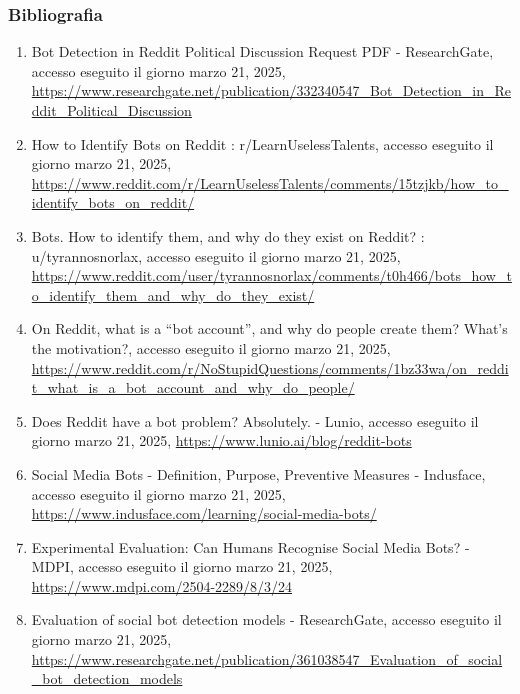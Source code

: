 \documentclass[
  12pt,
  letterpaper,
  DIV=11,
  numbers=noendperiod]{scrartcl}
\providecommand{\tightlist}{%
  \setlength{\itemsep}{0pt}\setlength{\parskip}{0pt}}\usepackage{longtable,booktabs,array}
\begin{document}
\subsubsection{\texorpdfstring{\textbf{Bibliografia}}{Bibliografia}}\label{bibliografia}

\begin{enumerate}
\def\labelenumi{\arabic{enumi}.}
\tightlist
\item
  Bot Detection in Reddit Political Discussion \textbar{} Request PDF -
  ResearchGate, accesso eseguito il giorno marzo 21, 2025,
  \url{https://www.researchgate.net/publication/332340547_Bot_Detection_in_Reddit_Political_Discussion}\\
\item
  How to Identify Bots on Reddit : r/LearnUselessTalents, accesso
  eseguito il giorno marzo 21, 2025,
  \url{https://www.reddit.com/r/LearnUselessTalents/comments/15tzjkb/how_to_identify_bots_on_reddit/}\\
\item
  Bots. How to identify them, and why do they exist on Reddit? :
  u/tyrannosnorlax, accesso eseguito il giorno marzo 21, 2025,
  \url{https://www.reddit.com/user/tyrannosnorlax/comments/t0h466/bots_how_to_identify_them_and_why_do_they_exist/}\\
\item
  On Reddit, what is a ``bot account'', and why do people create them?
  What's the motivation?, accesso eseguito il giorno marzo 21, 2025,
  \url{https://www.reddit.com/r/NoStupidQuestions/comments/1bz33wa/on_reddit_what_is_a_bot_account_and_why_do_people/}\\
\item
  Does Reddit have a bot problem? Absolutely. - Lunio, accesso eseguito
  il giorno marzo 21, 2025,
  \url{https://www.lunio.ai/blog/reddit-bots}\\
\item
  Social Media Bots - Definition, Purpose, Preventive Measures -
  Indusface, accesso eseguito il giorno marzo 21, 2025,
  \url{https://www.indusface.com/learning/social-media-bots/}\\
\item
  Experimental Evaluation: Can Humans Recognise Social Media Bots? -
  MDPI, accesso eseguito il giorno marzo 21, 2025,
  \url{https://www.mdpi.com/2504-2289/8/3/24}\\
\item
  Evaluation of social bot detection models - ResearchGate, accesso
  eseguito il giorno marzo 21, 2025,
  \url{https://www.researchgate.net/publication/361038547_Evaluation_of_social_bot_detection_models}\\

\end{enumerate}
\end{document}
